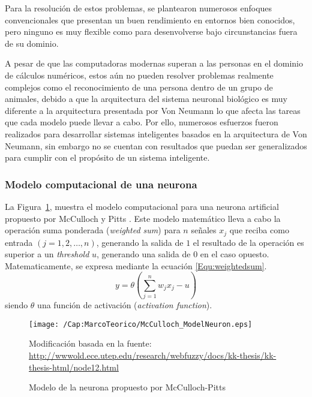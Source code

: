 Para la resolución de estos problemas, se plantearon numerosos enfoques 
convencionales que presentan un buen rendimiento en entornos bien conocidos, 
pero ninguno es muy flexible como para desenvolverse bajo circunstancias fuera
de su dominio.

A pesar de que las computadoras modernas superan a las personas en el dominio
de cálculos numéricos, estos aún no pueden resolver problemas realmente 
complejos como el reconocimiento de una persona dentro de un grupo de 
animales, debido a que la arquitectura del sistema neuronal biológico es muy
diferente a la arquitectura presentada por Von Neumann lo que afecta las 
tareas que cada modelo puede llevar a cabo. Por ello, numerosos esfuerzos 
fueron realizados para desarrollar sistemas inteligentes basados en la 
arquitectura de Von Neumann, sin embargo no se cuentan con resultados que 
puedan ser generalizados para cumplir con el propósito de un sistema
inteligente.

\subsubsection{Modelo computacional de una neurona}
La Figura~\ref{Fig:cap-marcoteorico:McCulloch-NeuronModel}, muestra el modelo
computacional para una neurona artificial propuesto por McCulloch y Pitts
\cite{McCulloch:1943:TBofMB}. Este modelo matemático lleva a cabo la operación 
suma ponderada (\textit{weighted sum}) para $n$ señales $x_j$ que reciba como 
entrada $(j = 1, 2, \dots, n)$, generando la salida de $1$ el resultado de la
operación es superior a un \textit{threshold} $u$, generando una salida de $0$ 
en el caso opuesto. Matematicamente, se expresa mediante la ecuación 
\ref{Equ:weightedsum}.
\begin{equation}
	y = \theta \left( \sum_{j=1}^{n}{w_j x_j - u} \right)
	\label{Equ:weightedsum}
\end{equation}
siendo $\theta$ una función de activación (\textit{activation function}).

\begin{figure}[h]
  \centering
  \texttt{[image: /Cap:MarcoTeorico/McCulloch\_ModelNeuron.eps]}
  \caption{Modelo de la neurona propuesto por McCulloch-Pitts}
  \tiny{Modificación basada en la fuente: 
  \url{http://wwwold.ece.utep.edu/research/webfuzzy/docs/kk-thesis/kk-thesis-html/node12.html}}
  \label{Fig:cap-marcoteorico:McCulloch-NeuronModel}
\end{figure}

